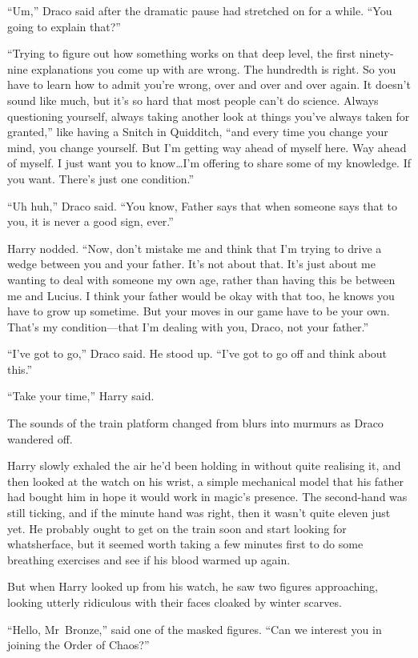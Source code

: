 “Um,” Draco said after the dramatic pause had stretched on for a while. “You going to explain that?”

“Trying to figure out how something works on that deep level, the first ninety-nine explanations you come up with are wrong. The hundredth is right. So you have to learn how to admit you’re wrong, over and over and over again. It doesn’t sound like much, but it’s so hard that most people can’t do science. Always questioning yourself, always taking another look at things you’ve always taken for granted,” like having a Snitch in Quidditch, “and every time you change your mind, you change yourself. But I’m getting way ahead of myself here. Way ahead of myself. I just want you to know…I’m offering to share some of my knowledge. If you want. There’s just one condition.”

“Uh huh,” Draco said. “You know, Father says that when someone says that to you, it is never a good sign, ever.”

Harry nodded. “Now, don’t mistake me and think that I’m trying to drive a wedge between you and your father. It’s not about that. It’s just about me wanting to deal with someone my own age, rather than having this be between me and Lucius. I think your father would be okay with that too, he knows you have to grow up sometime. But your moves in our game have to be your own. That’s my condition—that I’m dealing with you, Draco, not your father.”

“I’ve got to go,” Draco said. He stood up. “I’ve got to go off and think about this.”

“Take your time,” Harry said.

The sounds of the train platform changed from blurs into murmurs as Draco wandered off.

Harry slowly exhaled the air he’d been holding in without quite realising it, and then looked at the watch on his wrist, a simple mechanical model that his father had bought him in hope it would work in magic’s presence. The second-hand was still ticking, and if the minute hand was right, then it wasn’t quite eleven just yet. He probably ought to get on the train soon and start looking for whatsherface, but it seemed worth taking a few minutes first to do some breathing exercises and see if his blood warmed up again.

But when Harry looked up from his watch, he saw two figures approaching, looking utterly ridiculous with their faces cloaked by winter scarves.

“Hello, Mr~Bronze,” said one of the masked figures. “Can we interest you in joining the Order of Chaos?”

